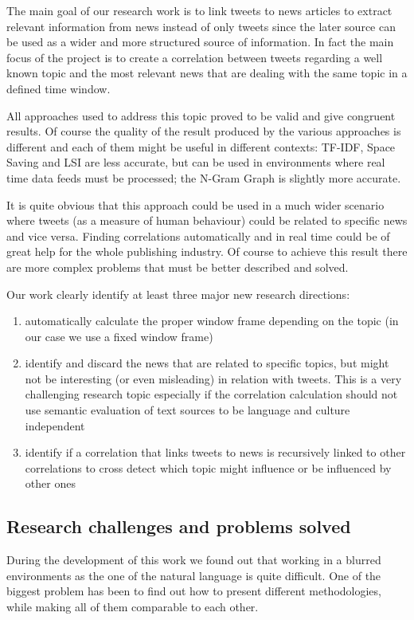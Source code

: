 The main goal of our research work is to link tweets to news articles to extract relevant information from news 
instead of only tweets since the later source can be used as a wider and more structured source of information. 
In fact the main focus of the project is to create a correlation between tweets
regarding a well known topic and 
the most relevant news that are dealing with the same topic in a defined time window.
 
All approaches used to address this topic proved to be valid and give congruent results. 
Of course the quality of the result produced by the various approaches is different and each of them
might be useful in different contexts: TF-IDF, Space Saving and LSI  are less accurate, but can be used in environments where 
real time data feeds must be processed; the N-Gram Graph is slightly
more accurate.


It is quite obvious that this approach could be used in a much wider scenario where tweets (as a measure of 
human behaviour) could be related to specific news and vice versa. Finding correlations automatically and 
in real time could be of great help for the whole publishing industry. Of course to achieve this result there 
are more complex problems that must be better described and solved.

Our work clearly identify at least three major new research directions:
\begin{enumerate}
	\item automatically calculate the proper window frame depending on the topic (in our case we use a fixed window frame)
	\item identify and discard the news that are related to specific topics, but might not be interesting (or even misleading) in relation with tweets. This is a very challenging research topic especially if the correlation calculation should not use semantic evaluation of text sources to be language and culture  independent 
	\item identify if a correlation that links tweets to news is recursively linked to other correlations to cross detect which topic might influence or be influenced by other ones
\end{enumerate}

\subsection*{Research challenges and problems solved}
During the development of this work we found out that working in a blurred
environments as the one of the natural language is quite difficult. One of the
biggest problem has been to find out how to present different methodologies,
while making all of them comparable to each other.

